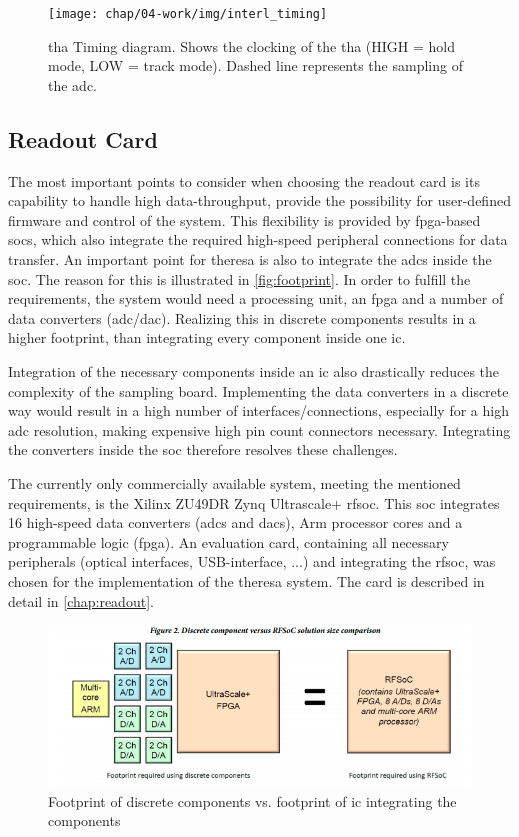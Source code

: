 \begin{figure}
	\centering
	\tikzexternaldisable
	\texttt{[image: chap/04-work/img/interl\_timing]}
	\tikzexternalenable
	\caption[Track-And-Hold Timing diagram]{\gls{tha} Timing diagram. Shows the clocking of the \gls{tha} (HIGH = hold mode, LOW = track mode). Dashed line represents the sampling of the \gls{adc}.}
	\label{fig:THA}
\end{figure}

 

\subsection{Readout Card}
The most important points to consider when choosing the readout card is its capability to handle high data-throughput, provide the possibility for user-defined firmware and control of the system.
This flexibility is provided by \gls{fpga}-based \glspl{soc}, which also integrate the required high-speed peripheral connections for data transfer.
An important point for \gls{theresa} is also to integrate the \glspl{adc} inside the \gls{soc}. 
The reason for this is illustrated in \autoref{fig:footprint}. 
In order to fulfill the requirements, the system would need a processing unit, an \gls{fpga} and a number of data converters (\gls{adc}/\gls{dac}).
Realizing this in discrete components results in a higher footprint, than integrating every component inside one \gls{ic}.

Integration of the necessary components inside an \gls{ic} also drastically reduces the complexity of the sampling board.
Implementing the data converters in a discrete way would result in a high number of interfaces/connections, especially for a high \gls{adc} resolution,  making expensive high pin count connectors necessary.
Integrating the converters inside the \gls{soc} therefore resolves these challenges.

The currently only commercially available system, meeting the mentioned requirements, is the Xilinx ZU49DR Zynq Ultrascale+ \gls{rf}\gls{soc}.
This \gls{soc} integrates 16 high-speed data converters (\glspl{adc} and \glspl{dac}), Arm processor cores and a programmable logic (\gls{fpga}).
An evaluation card, containing all necessary peripherals (optical interfaces, USB-interface, ...) and integrating the \gls{rfsoc}, was chosen for the implementation of the \gls{theresa} system.
The card is described in detail in \autoref{chap:readout}.

 
\begin{figure}[tbh]
	\centering
	\includegraphics[width = \textwidth]{chap/04-work/img/footprint}
	\caption[Discrete components vs. IC]{Footprint of discrete components vs. footprint of \gls{ic} integrating the components}
	\label{fig:footprint}
\end{figure}
